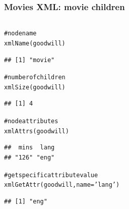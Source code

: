 \documentclass{beamer}\usepackage[]{graphicx}\usepackage[]{color}
\makeatletter
\newcommand{\hlstr}[1]{\textcolor[rgb]{0.063,0.58,0.627}{#1}}%
\newcommand{\hlcom}[1]{\textcolor[rgb]{0.588,0.588,0.588}{#1}}%
\newcommand{\hlstd}[1]{\textcolor[rgb]{0.196,0.196,0.196}{#1}}%
\newcommand{\hlkwc}[1]{\textcolor[rgb]{0,0.631,0.314}{#1}}%
\newcommand{\hlkwd}[1]{\textcolor[rgb]{0.78,0.227,0.412}{#1}}%
\newenvironment{kframe}{%
 \def\at@end@of@kframe{}%
 \ifinner\ifhmode%
  \def\at@end@of@kframe{\end{minipage}}%
  \begin{minipage}{\columnwidth}%
 \fi\fi%
 \def\FrameCommand##1{\hskip\@totalleftmargin \hskip-\fboxsep
 \colorbox{shadecolor}{##1}\hskip-\fboxsep
     \hskip-\linewidth \hskip-\@totalleftmargin \hskip\columnwidth}%
 \MakeFramed {\advance\hsize-\width
   \@totalleftmargin\z@ \linewidth\hsize
   \@setminipage}}%
 {\par\unskip\endMakeFramed%
 \at@end@of@kframe}
\newenvironment{knitrout}{}{} %
\makeatother
\begin{document}
\begin{frame}[fragile]
\end{frame}


\begin{frame}[fragile]
\frametitle{Movies XML: movie children}

\begin{columns}[t]
\begin{column}{0.5\textwidth}
\begin{knitrout}\tiny
{}\color{fgcolor}\begin{kframe}
\begin{alltt}
\hlcom{# node name}
\hlkwd{xmlName}\hlstd{(goodwill)}
\end{alltt}
\begin{verbatim}
## [1] "movie"
\end{verbatim}
\begin{alltt}
\hlcom{# number of children}
\hlkwd{xmlSize}\hlstd{(goodwill)}
\end{alltt}
\begin{verbatim}
## [1] 4
\end{verbatim}
\begin{alltt}
\hlcom{# node attributes}
\hlkwd{xmlAttrs}\hlstd{(goodwill)}
\end{alltt}
\begin{verbatim}
##  mins  lang 
## "126" "eng"
\end{verbatim}
\begin{alltt}
\hlcom{# get specific attribute value}
\hlkwd{xmlGetAttr}\hlstd{(goodwill,} \hlkwc{name} \hlstd{=} \hlstr{'lang'}\hlstd{)}
\end{alltt}
\begin{verbatim}
## [1] "eng"
\end{verbatim}
\end{kframe}
\end{knitrout}
\end{column}


\end{columns}
\end{frame}
\end{document}
